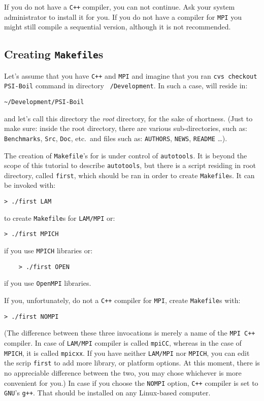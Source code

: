 If you do not have a {\tt C++} compiler, you can not continue. Ask your system 
administrator to install it for you. If you do not have a compiler for {\tt MPI} 
you might still compile a sequential version, although it is not recommended. 

\subsection{Creating {\tt Makefile}s}
\label{sub_sec_creating_makefiles}

Let's assume that you have {\tt C++} and {\tt MPI} and imagine that you ran 
{\tt cvs checkout PSI-Boil} command in directory {\tt ~/Development}.
In such a case, {\psiboil} will reside in:
%
\begin{verbatim}
~/Development/PSI-Boil
\end{verbatim}
%
and let's call this directory the {\em root} directory, for the sake of shortness.
(Just to make sure: inside the root directory, there are various 
sub-directories, such as: {\tt Benchmarks}, {\tt Src}, {\tt Doc}, etc.\ and 
files such as: {\tt AUTHORS}, {\tt NEWS}, {\tt README} \dots).

The creation of {\tt Makefile}'s for {\psiboil} is under control of 
{\tt autotools}. It is beyond the scope of this tutorial to describe {\tt autotools}, 
but there is a script residing in root directory, called {\tt first}, which
should be ran in order to create {\tt Makefile}s. It can be invoked with:
%
\begin{verbatim}
> ./first LAM
\end{verbatim}
%
to create {\tt Makefile}s for {\tt LAM/MPI} or:
%
\begin{verbatim}
> ./first MPICH
\end{verbatim}
%
if you use {\tt MPICH} libraries or:
%
\begin{verbatim}
	> ./first OPEN
\end{verbatim}
%
if you use {\tt OpenMPI} libraries. 

If you, unfortunately, do not a {\tt C++} compiler for {\tt MPI}, create {\tt Makefile}s with:
%
\begin{verbatim}
> ./first NOMPI
\end{verbatim}
%
(The difference between these three invocations
is merely a name of the {\tt MPI C++} compiler. In case of {\tt LAM/MPI} compiler
is called {\tt mpiCC}, whereas in the case of {\tt MPICH}, it is called {\tt mpicxx}.
If you have neither {\tt LAM/MPI} nor {\tt MPICH}, you can edit the scrip {\tt first}
to add more library, or platform options. At this moment, there is no appreciable 
difference between the two, you may chose whichever is more convenient for you.) 
In case if you choose the {\tt NOMPI} option, {\tt C++} compiler is set to {\tt GNU}'s
{\tt g++}. That should be installed on any Linux-based computer. 

